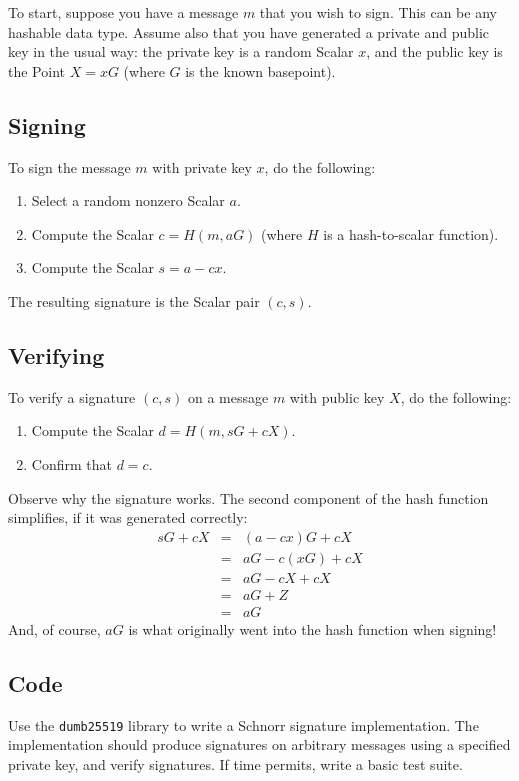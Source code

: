 \documentclass{article}
\begin{document}
To start, suppose you have a message $m$ that you wish to sign. This can be any hashable data type. Assume also that you have generated a private and public key in the usual way: the private key is a random Scalar $x$, and the public key is the Point $X = xG$ (where $G$ is the known basepoint).

\subsection{Signing}
To sign the message $m$ with private key $x$, do the following:
\begin{enumerate}
\item Select a random nonzero Scalar $a$.
\item Compute the Scalar $c = H(m, aG)$ (where $H$ is a hash-to-scalar function).
\item Compute the Scalar $s = a - cx$.
\end{enumerate}
The resulting signature is the Scalar pair $(c,s)$.

\subsection{Verifying}
To verify a signature $(c,s)$ on a message $m$ with public key $X$, do the following:
\begin{enumerate}
\item Compute the Scalar $d = H(m, sG+cX)$.
\item Confirm that $d = c$.
\end{enumerate}

Observe why the signature works. The second component of the hash function simplifies, if it was generated correctly:
\begin{eqnarray*}
sG + cX &=& (a - cx)G + cX \\
&=& aG - c(xG) + cX \\
&=& aG - cX + cX \\
&=& aG + Z \\
&=& aG
\end{eqnarray*}
And, of course, $aG$ is what originally went into the hash function when signing!

\subsection{Code}
Use the \texttt{dumb25519} library to write a Schnorr signature implementation. The implementation should produce signatures on arbitrary messages using a specified private key, and verify signatures. If time permits, write a basic test suite.
\end{document}
